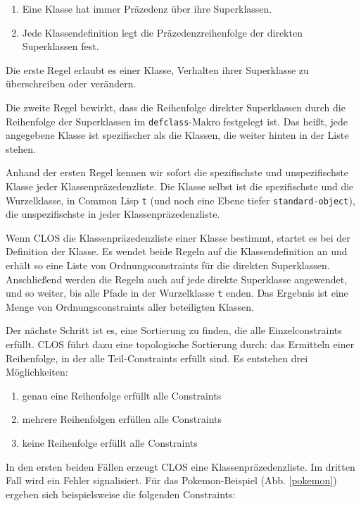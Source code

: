 \begin{enumerate}
 \item Eine Klasse hat immer Präzedenz über ihre Superklassen.
 \item Jede Klassendefinition legt die Präzedenzreihenfolge der direkten Superklassen fest.
\end{enumerate}

Die erste Regel erlaubt es einer Klasse, Verhalten ihrer Superklasse zu überschreiben oder verändern.

Die zweite Regel bewirkt, dass die Reihenfolge direkter Superklassen durch die Reihenfolge der Superklassen im \texttt{defclass}-Makro festgelegt ist. Das heißt, jede angegebene Klasse ist spezifischer als die Klassen, die weiter hinten in der Liste stehen.

Anhand der ersten Regel kennen wir sofort die spezifischste und unspezifischste Klasse jeder Klassenpräzedenzliste. Die Klasse selbst ist die spezifischste und die Wurzelklasse, in Common Lisp \texttt{t} (und noch eine Ebene tiefer \texttt{standard-object}), die unspezifischste in jeder Klassenpräzedenzliste.

Wenn CLOS die Klassenpräzedenzliste einer Klasse bestimmt, startet es bei der Definition der Klasse. Es wendet beide Regeln auf die Klassendefinition an und erhält so eine Liste von Ordnungsconstraints für die direkten Superklassen. Anschließend werden die Regeln auch auf jede direkte Superklasse angewendet, und so weiter, bis alle Pfade in der Wurzelklasse \texttt{t} enden. Das Ergebnis ist eine Menge von Ordnungsconstraints aller beteiligten Klassen.

Der nächste Schritt ist es, eine Sortierung zu finden, die alle Einzelconstraints erfüllt. CLOS führt dazu eine topologische Sortierung durch: das Ermitteln einer Reihenfolge, in der alle Teil-Constraints erfüllt sind. Es entstehen drei Möglichkeiten:
\begin{enumerate}
 \item genau eine Reihenfolge erfüllt alle Constraints
 \item mehrere Reihenfolgen erfüllen alle Constraints
 \item keine Reihenfolge erfüllt alle Constraints
\end{enumerate}

In den ersten beiden Fällen erzeugt CLOS eine Klassenpräzedenzliste. Im dritten Fall wird ein Fehler signalisiert. Für das Pokemon-Beispiel (Abb. \ref{pokemon}) ergeben sich beispielsweise die folgenden Constraints:

